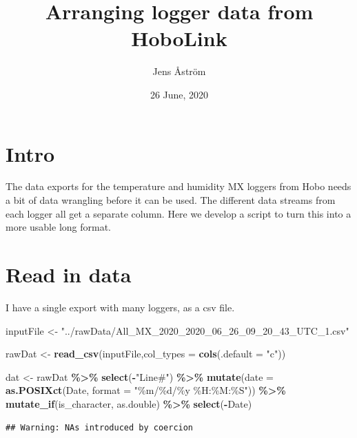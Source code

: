 \documentclass[]{article}
\title{Arranging logger data from HoboLink}
\author{Jens Åström}
\date{26 June, 2020}
\newenvironment{Shaded}{\begin{snugshade}}{\end{snugshade}}
\newcommand{\DataTypeTok}[1]{\textcolor[rgb]{0.13,0.29,0.53}{#1}}
\newcommand{\KeywordTok}[1]{\textcolor[rgb]{0.13,0.29,0.53}{\textbf{#1}}}
\newcommand{\NormalTok}[1]{#1}
\newcommand{\OperatorTok}[1]{\textcolor[rgb]{0.81,0.36,0.00}{\textbf{#1}}}
\newcommand{\StringTok}[1]{\textcolor[rgb]{0.31,0.60,0.02}{#1}}
\begin{document}
\maketitle

{
\setcounter{tocdepth}{2}
\tableofcontents
}
\hypertarget{intro}{%
\section{Intro}\label{intro}}

The data exports for the temperature and humidity MX loggers from Hobo
needs a bit of data wrangling before it can be used. The different data
streams from each logger all get a separate column. Here we develop a
script to turn this into a more usable long format.

\hypertarget{read-in-data}{%
\section{Read in data}\label{read-in-data}}

I have a single export with many loggers, as a csv file.

\begin{Shaded}
\begin{Highlighting}[]
\NormalTok{inputFile <{-}}\StringTok{ "../rawData/All\_MX\_2020\_2020\_06\_26\_09\_20\_43\_UTC\_1.csv"}

\NormalTok{rawDat <{-}}\StringTok{ }\KeywordTok{read\_csv}\NormalTok{(inputFile,}\DataTypeTok{col\_types =} \KeywordTok{cols}\NormalTok{(}\DataTypeTok{.default =} \StringTok{"c"}\NormalTok{))}

\NormalTok{dat <{-}}\StringTok{ }\NormalTok{rawDat }\OperatorTok{\%>\%}\StringTok{  }
\StringTok{  }\KeywordTok{select}\NormalTok{(}\OperatorTok{{-}}\StringTok{"Line\#"}\NormalTok{) }\OperatorTok{\%>\%}\StringTok{ }
\StringTok{  }\KeywordTok{mutate}\NormalTok{(}\DataTypeTok{date =} \KeywordTok{as.POSIXct}\NormalTok{(Date, }\DataTypeTok{format =} \StringTok{"\%m/\%d/\%y \%H:\%M:\%S"}\NormalTok{)) }\OperatorTok{\%>\%}\StringTok{ }
\StringTok{  }\KeywordTok{mutate\_if}\NormalTok{(is\_character, as.double) }\OperatorTok{\%>\%}\StringTok{ }
\StringTok{  }\KeywordTok{select}\NormalTok{(}\OperatorTok{{-}}\NormalTok{Date)}
\end{Highlighting}
\end{Shaded}

\begin{verbatim}
## Warning: NAs introduced by coercion
\end{verbatim}
\end{document}
